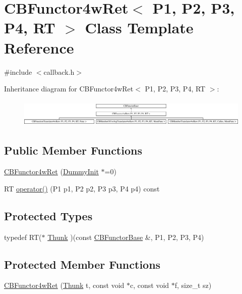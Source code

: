 \hypertarget{class_c_b_functor4w_ret}{\section{C\+B\+Functor4w\+Ret$<$ P1, P2, P3, P4, R\+T $>$ Class Template Reference}
\label{class_c_b_functor4w_ret}
}


{\ttfamily \#include $<$callback.\+h$>$}

Inheritance diagram for C\+B\+Functor4w\+Ret$<$ P1, P2, P3, P4, R\+T $>$\+:\begin{figure}[H]
\begin{center}
\leavevmode
\includegraphics[height=1.317647cm]{class_c_b_functor4w_ret}
\end{center}
\end{figure}
\subsection*{Public Member Functions}
\begin{DoxyCompactItemize}
\item 
\hyperlink{class_c_b_functor4w_ret_a356e08cde4fbc60704b58186d93d89d0}{C\+B\+Functor4w\+Ret} (\hyperlink{class_c_b_functor_base_1_1_dummy_init}{Dummy\+Init} $\ast$=0)
\item 
R\+T \hyperlink{class_c_b_functor4w_ret_a4ba872c7ae7fb3a7395378ceb76b6bb9}{operator()} (P1 p1, P2 p2, P3 p3, P4 p4) const 
\end{DoxyCompactItemize}
\subsection*{Protected Types}
\begin{DoxyCompactItemize}
\item 
typedef R\+T($\ast$ \hyperlink{class_c_b_functor4w_ret_abffcc69981f4bcdf7e42458c1c771c88}{Thunk} )(const \hyperlink{class_c_b_functor_base}{C\+B\+Functor\+Base} \&, P1, P2, P3, P4)
\end{DoxyCompactItemize}
\subsection*{Protected Member Functions}
\begin{DoxyCompactItemize}
\item 
\hyperlink{class_c_b_functor4w_ret_ab9b160f31455c0b7d470470f7c52551a}{C\+B\+Functor4w\+Ret} (\hyperlink{class_c_b_functor4w_ret_abffcc69981f4bcdf7e42458c1c771c88}{Thunk} t, const void $\ast$c, const void $\ast$f, size\+\_\+t sz)
\end{DoxyCompactItemize}

